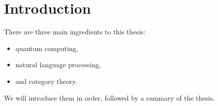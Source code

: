 
\chapter*{Introduction}

There are three main ingredients to this thesis:

\begin{itemize}
\item quantum computing,
\item natural language processing,
\item and category theory.
\end{itemize}

We will introduce them in order, followed by a summary of the thesis.



%
%
%
%
%
